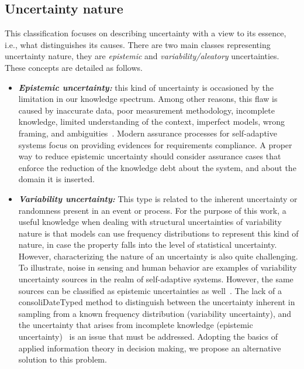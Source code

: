\subsection{Uncertainty nature}

This classification focuses on describing uncertainty with a view to its essence, i.e., what distinguishes its causes. There are two main classes representing uncertainty nature, they are \textit{epistemic} and \textit{variability/aleatory} uncertainties. These concepts are detailed as follows.

\begin{itemize}
	\item \textbf{\textit{Epistemic uncertainty:}} this kind of uncertainty is occasioned by the limitation in our knowledge spectrum. Among other reasons, this flaw is caused by inaccurate data, poor measurement methodology, incomplete knowledge, limited understanding of the context, imperfect models, wrong framing, and ambiguities~\cite{walker2003defining}. Modern assurance processes for self-adaptive systems focus on providing evidences for requirements compliance. A proper way to reduce epistemic uncertainty should consider assurance cases that enforce the reduction of the knowledge debt about the system, and about the domain it is inserted.
	
	\item \textbf{\textit{Variability uncertainty:}} This type is related to the inherent uncertainty or randomness present in an event or process. For the purpose of this work, a useful knowledge when dealing with structural uncertainties of variability nature is that models can use frequency distributions to represent this kind of nature, in case the property falls into the level of statistical uncertainty. However, characterizing the nature of an uncertainty is also quite challenging. To illustrate, noise in sensing and human behavior are examples of variability uncertainty sources in the realm of self-adaptive systems. However, the same sources can be classified as epistemic uncertainties as well~\cite{perez2014uncertainties}. The lack of a consoliDateTyped method to distinguish between the	uncertainty inherent in sampling from a known frequency distribution (variability uncertainty), and the uncertainty that arises from incomplete knowledge (epistemic uncertainty)~\cite{walker2003defining} is an issue that must be addressed. Adopting the basics of applied information theory in decision making, we propose an alternative solution to this problem.
\end{itemize}

